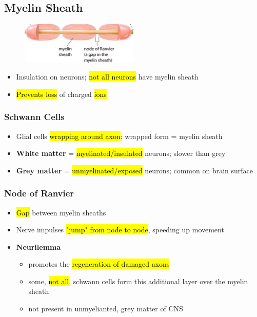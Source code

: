 \documentclass[a4paper,12pt]{article}
\begin{document}
\subsection{Myelin Sheath}
\begin{figure}[H]
    \centering
    \includegraphics[width=0.50\textwidth]{ranvier}
\end{figure}

\begin{itemize}
    \item{Insulation on neurons; \hl{not all neurons} have myelin sheath}
    \item{\hl{Prevents loss} of charged \hl{ions}}
\end{itemize}

\subsubsection{Schwann Cells}
\begin{itemize}
    \item{Glial cells \hl{wrapping around axon}; wrapped form = myelin sheath}
    \item{\textbf{White matter} = \hl{myelinated/insulated} neurons; slower than grey}
    \item{\textbf{Grey matter} = \hl{unmyelinated/exposed} neurons; common on brain surface}
\end{itemize}

\subsubsection{Node of Ranvier}
\begin{itemize}
    \item{\hl{Gap} between myelin sheaths}
    \item{Nerve impulses \hl{"jump" from node to node}, speeding up movement}
    \item{
            \textbf{Neurilemma}
            \begin{itemize}
                \item{promotes the \hl{regeneration of damaged axons}}
                \item{some, \hl{not all}, schwann cells form this additional layer over the myelin sheath}
                \item{not present in unmyelianted, grey matter of CNS}
            \end{itemize}
        }
\end{itemize}
\end{document}
